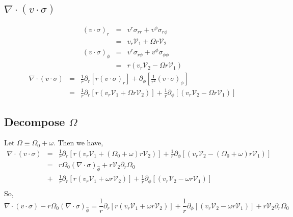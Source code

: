 \documentclass{article}
\begin{document}
\subsection{$\nabla \cdot(v \cdot \sigma)$}
\begin{eqnarray*}
  (v \cdot \sigma)_r &=& v^r \sigma_{rr} + v^{\phi} \sigma_{r\phi}\\
                     &=& v_r \mathcal{V}_1 + \Omega r \mathcal{V}_2\\
  (v \cdot \sigma)_{\phi} &=& v^r \sigma_{r\phi} + v^{\phi} \sigma_{\phi \phi}\\
                          &=& r(v_r  \mathcal{V}_2 - \Omega r \mathcal{V}_1)
\end{eqnarray*}
\begin{eqnarray*}
  \nabla \cdot(v \cdot \sigma) &=& \frac{1}{r}\partial_r\left[r(v\cdot \sigma)_r\right] +\partial_{\phi}\left[ \frac{1}{r^{2}} (v\cdot \sigma)_{\phi}\right] \\
                               &=& \frac{1}{r}\partial_r\left[r( v_r \mathcal{V}_1 + \Omega r \mathcal{V}_2)\right] +\frac{1}{r}\partial_{\phi}\left[  (v_r  \mathcal{V}_2 - \Omega r \mathcal{V}_1)\right] 
\end{eqnarray*}

\subsection{Decompose $\Omega$}
Let $\Omega \equiv \Omega_0 + \omega$. Then we have,
\begin{eqnarray*}
  \nabla \cdot(v \cdot \sigma) &=& \frac{1}{r}\partial_r\left[r( v_r \mathcal{V}_1 + (\Omega_0+\omega) r \mathcal{V}_2)\right] +\frac{1}{r}\partial_{\phi}\left[  (v_r  \mathcal{V}_2 - (\Omega_0+\omega) r \mathcal{V}_1)\right]\\
                               &=& r \Omega_0 (\nabla \cdot \sigma)_{\hat{\phi}}  + r \mathcal{V}_2 \partial_r \Omega_0\\
                               &+&  \frac{1}{r}\partial_r\left[r( v_r \mathcal{V}_1 + \omega r \mathcal{V}_2)\right] +\frac{1}{r}\partial_{\phi}\left[  (v_r  \mathcal{V}_2 - \omega r \mathcal{V}_1)\right]\\
\end{eqnarray*}
So,
\begin{equation}
  \boxed{\nabla \cdot(v \cdot \sigma) -  r \Omega_0 (\nabla \cdot \sigma)_{\hat{\phi}} =  \frac{1}{r}\partial_r\left[r( v_r \mathcal{V}_1 + \omega r \mathcal{V}_2)\right] +\frac{1}{r}\partial_{\phi}\left[  (v_r  \mathcal{V}_2 - \omega r \mathcal{V}_1)\right] + r \mathcal{V}_2 \partial_r \Omega_0} 
\end{equation}
\end{document}
